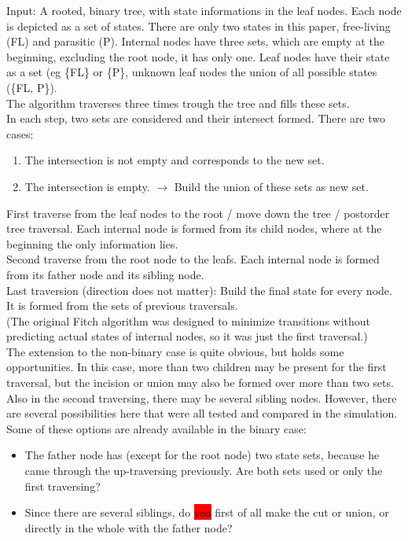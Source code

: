         Input: A rooted, binary tree, with state informations in the leaf nodes. Each node is depicted as 
          a set of states. There are only two states in this paper, free-living (FL) and parasitic (P). 
          Internal nodes have three sets, which are empty at the beginning, excluding the root node, it 
          has only one. Leaf nodes have their state as a set (eg \{FL\} or \{P\}, unknown leaf nodes the 
          union of all possible states (\{FL, P\}). \\
        The algorithm traverses three times trough the tree and fills these sets. \\
        In each step, two sets are considered and their intersect formed. There are two cases:
        \begin{enumerate}
          \item The intersection is not empty and corresponds to the new set.
          \item The intersection is empty. $\rightarrow$ Build the union of these sets as new set.
        \end{enumerate}
        First traverse from the leaf nodes to the root / move down the tree / postorder tree traversal. 
          Each internal node is formed from its child nodes, where at the beginning the only information
          lies. \\
        Second traverse from the root node to the leafs. Each internal node is formed from its father node 
          and its sibling node. \\
        Last traversion (direction does not matter): Build the final state for every node. It is formed 
          from the sets of previous traversals. \\
        (The original Fitch algorithm was designed to minimize transitions without predicting actual states 
          of internal nodes, so it was just the first traversal.) \\
        The extension to the non-binary case is quite obvious, but holds some opportunities. In this case, 
          more than two children may be present for the first traversal, but the incision or union may 
          also be formed over more than two sets. Also in the second traversing, there may be several 
          sibling nodes. However, there are several possibilities here that were all tested and compared 
          in the simulation. Some of these options are already available in the binary case:
        \begin{itemize}
          \item The father node has (except for the root node) two state sets, because he came through 
            the up-traversing previously. Are both sets used or only the first traversing?
          \item Since there are several siblings, do \colorbox{red}{you} first of all make the cut or union, 
            or directly in the whole with the father node?
        \end{itemize}
